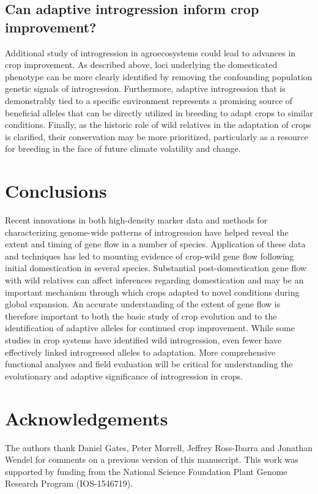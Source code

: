 \documentclass[11pt]{article}
\begin{document}
{\subsection*{Can adaptive introgression inform crop improvement?}

Additional study of introgression in agroecosystems could lead to advances in crop improvement.
As described above, loci underlying the domesticated phenotype can be more clearly identified by removing the confounding population genetic signals of introgression.
Furthermore, adaptive introgression that is demonstrably tied to a specific environment represents a promising source of beneficial alleles that can be directly utilized in breeding to adapt crops to similar conditions.
Finally, as the historic role of wild relatives in the adaptation of crops is clarified, their conservation may be more prioritized, particularly as a resource for breeding in the face of future climate volatility and change.

\section*{Conclusions}

Recent innovations in both high-density marker data and methods for characterizing genome-wide patterns of introgression have helped reveal the extent and timing of gene flow in a number of species.
Application of these data and techniques has led to mounting evidence of crop-wild gene flow following initial domestication in several species.
Substantial post-domestication gene flow with wild relatives can affect inferences regarding domestication and may be an important mechanism through which crops adapted to novel conditions during global expansion.
An accurate understanding of the extent of gene flow is therefore important to both the basic study of crop evolution and to the identification of adaptive alleles for continued crop improvement.
While some studies in crop systems have identified wild introgression, even fewer have effectively linked introgressed alleles to adaptation.
More comprehensive functional analyses and field evaluation will be critical for understanding the evolutionary and adaptive significance of introgression in crops.

\section*{Acknowledgements}
The authors thank Daniel Gates, Peter Morrell, Jeffrey Ross-Ibarra and Jonathan Wendel for comments on a previous version of this manuscript. This work was supported by funding from the National Science Foundation Plant Genome Research Program (IOS-1546719).


}
\end{document}
